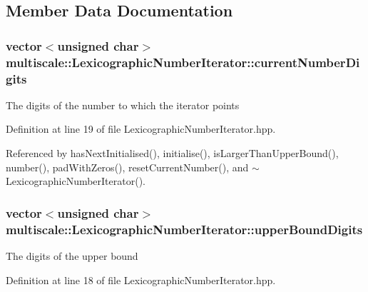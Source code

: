 \subsection{\-Member \-Data \-Documentation}
\hypertarget{classmultiscale_1_1LexicographicNumberIterator_af42ebeea695a31c2da714332c520ae79}{
\subsubsection[{current\-Number\-Digits}]{\setlength{\rightskip}{0pt plus 5cm}vector$<$unsigned char$>$ {\bf multiscale\-::\-Lexicographic\-Number\-Iterator\-::current\-Number\-Digits}}}\label{classmultiscale_1_1LexicographicNumberIterator_af42ebeea695a31c2da714332c520ae79}
\-The digits of the number to which the iterator points 

\-Definition at line 19 of file \-Lexicographic\-Number\-Iterator.\-hpp.



\-Referenced by has\-Next\-Initialised(), initialise(), is\-Larger\-Than\-Upper\-Bound(), number(), pad\-With\-Zeros(), reset\-Current\-Number(), and $\sim$\-Lexicographic\-Number\-Iterator().

\hypertarget{classmultiscale_1_1LexicographicNumberIterator_a909a054ae4d3e79e5daa3059a94000d0}{
\subsubsection[{upper\-Bound\-Digits}]{\setlength{\rightskip}{0pt plus 5cm}vector$<$unsigned char$>$ {\bf multiscale\-::\-Lexicographic\-Number\-Iterator\-::upper\-Bound\-Digits}}}\label{classmultiscale_1_1LexicographicNumberIterator_a909a054ae4d3e79e5daa3059a94000d0}
\-The digits of the upper bound 

\-Definition at line 18 of file \-Lexicographic\-Number\-Iterator.\-hpp.



